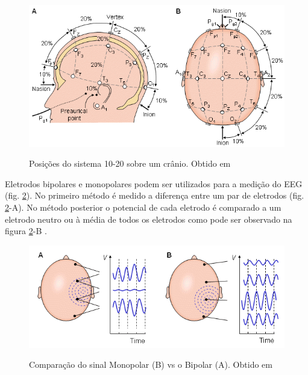 \begin{figure}[!ht]
	\begin{center}
		\caption{Posi\c{c}\~oes do sistema 10-20 sobre um cr\^anio. Obtido em \cite{EEGPrinciple} }		
		\includegraphics[scale=1]{./figuras/10-20_cranio}
		\label{fig:10-20}
	\end{center}
\end{figure}
\par
Eletrodos bipolares e monopolares podem ser utilizados para a medição do \ac{EEG} (fig. \ref{fig:bipolar-vs-monopolar}).
 No primeiro método é medido a diferença entre um par de eletrodos (fig. \ref{fig:bipolar-vs-monopolar}-A).
 No método posterior o potencial de cada eletrodo é comparado a um eletrodo neutro ou \`a m\'edia de todos os eletrodos como pode ser observado na figura \ref{fig:bipolar-vs-monopolar}-B \cite{EEGPrinciple}.
\begin{figure}[!ht]
	\begin{center}
		\caption{Compara\c{c}\~ao do sinal Monopolar (B) vs o Bipolar (A). Obtido em \cite{EEGPrinciple} }		
		\includegraphics[scale=1]{./figuras/Bipolar-vs-Monopolar}
		\label{fig:bipolar-vs-monopolar}
	\end{center}
\end{figure}
\clearpage
